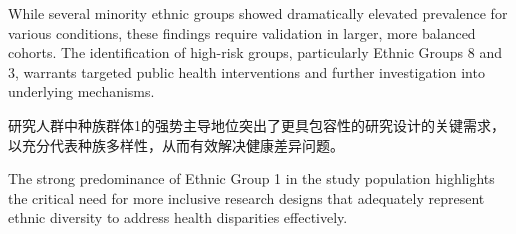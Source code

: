 \documentclass[12pt,a4paper]{article}
\begin{document}
While several minority ethnic groups showed dramatically elevated prevalence for various conditions, these findings require validation in larger, more balanced cohorts. The identification of high-risk groups, particularly Ethnic Groups 8 and 3, warrants targeted public health interventions and further investigation into underlying mechanisms.

研究人群中种族群体1的强势主导地位突出了更具包容性的研究设计的关键需求，以充分代表种族多样性，从而有效解决健康差异问题。

The strong predominance of Ethnic Group 1 in the study population highlights the critical need for more inclusive research designs that adequately represent ethnic diversity to address health disparities effectively.

\vspace{1cm}
\end{document}
